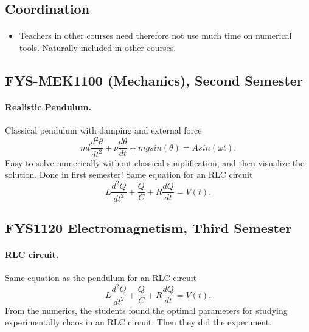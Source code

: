 \documentclass[%
twoside,                 %
final,                   %
10pt]{article}
\begin{document}
\noindent



\subsection{Coordination}

\paragraph{}
\begin{itemize}
\item Teachers in other courses need therefore not use much time on numerical tools. Naturally included in other courses.
\end{itemize}

\noindent





\subsection{FYS-MEK1100 (Mechanics), Second Semester}

\paragraph{Realistic Pendulum.}

Classical pendulum with damping and external force
\[
  ml\frac{d^2\theta}{dt^2}+\nu\frac{d\theta}{dt}  +mgsin(\theta)=Asin(\omega t).
\]
Easy to solve numerically without classical simplification, and then visualize the solution.  Done in first semester!
Same equation for an RLC circuit 
\[
L\frac{d^2Q}{dt^2}+\frac{Q}{C}+R\frac{dQ}{dt}=V(t).
\]




\subsection{FYS1120 Electromagnetism, Third Semester}

\paragraph{RLC circuit.}
Same equation as the pendulum for an RLC circuit 
\[
L\frac{d^2Q}{dt^2}+\frac{Q}{C}+R\frac{dQ}{dt}=V(t).
\]
From the numerics, 
the students found the optimal parameters for studying experimentally chaos
in an RLC circuit. Then they did the experiment.
\end{document}
